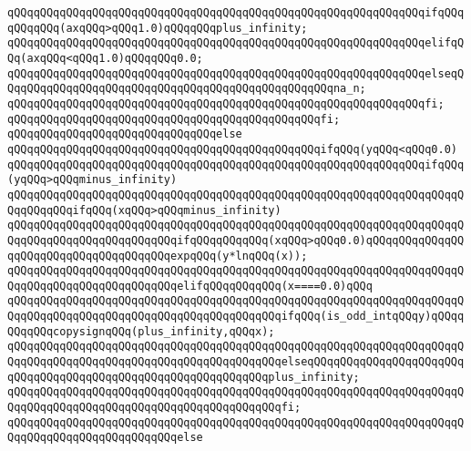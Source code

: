 \newline
\verb|qQQqqQQqqQQqqQQqqQQqqQQqqQQqqQQqqQQqqQQqqQQqqQQqqQQqqQQqqQQqqQQqifqQQqqQQqqQQq(axqQQq>qQQq1.0)qQQqqQQqplus_infinity;|\newline
\verb|qQQqqQQqqQQqqQQqqQQqqQQqqQQqqQQqqQQqqQQqqQQqqQQqqQQqqQQqqQQqqQQqelifqQQq(axqQQq<qQQq1.0)qQQqqQQq0.0;|\newline
\verb|qQQqqQQqqQQqqQQqqQQqqQQqqQQqqQQqqQQqqQQqqQQqqQQqqQQqqQQqqQQqqQQqelseqQQqqQQqqQQqqQQqqQQqqQQqqQQqqQQqqQQqqQQqqQQqqQQqqQQqna_n;|\newline
\verb|qQQqqQQqqQQqqQQqqQQqqQQqqQQqqQQqqQQqqQQqqQQqqQQqqQQqqQQqqQQqqQQqfi;|\newline
\verb|qQQqqQQqqQQqqQQqqQQqqQQqqQQqqQQqqQQqqQQqqQQqqQQqfi;|\newline
\verb|qQQqqQQqqQQqqQQqqQQqqQQqqQQqqQQqelse|\newline
\verb|qQQqqQQqqQQqqQQqqQQqqQQqqQQqqQQqqQQqqQQqqQQqqQQqifqQQq(yqQQq<qQQq0.0)|\newline
\newline
\verb|qQQqqQQqqQQqqQQqqQQqqQQqqQQqqQQqqQQqqQQqqQQqqQQqqQQqqQQqqQQqqQQqifqQQq(yqQQq>qQQqminus_infinity)|\newline
\newline
\verb|qQQqqQQqqQQqqQQqqQQqqQQqqQQqqQQqqQQqqQQqqQQqqQQqqQQqqQQqqQQqqQQqqQQqqQQqqQQqqQQqifqQQq(xqQQq>qQQqminus_infinity)|\newline
\verb|qQQqqQQqqQQqqQQqqQQqqQQqqQQqqQQqqQQqqQQqqQQqqQQqqQQqqQQqqQQqqQQqqQQqqQQqqQQqqQQqqQQqqQQqqQQqqQQqifqQQqqQQqqQQq(xqQQq>qQQq0.0)qQQqqQQqqQQqqQQqqQQqqQQqqQQqqQQqqQQqqQQqexpqQQq(y*lnqQQq(x));|\newline
\verb|qQQqqQQqqQQqqQQqqQQqqQQqqQQqqQQqqQQqqQQqqQQqqQQqqQQqqQQqqQQqqQQqqQQqqQQqqQQqqQQqqQQqqQQqqQQqqQQqelifqQQqqQQqqQQq(x====0.0)qQQq|\newline
\verb|qQQqqQQqqQQqqQQqqQQqqQQqqQQqqQQqqQQqqQQqqQQqqQQqqQQqqQQqqQQqqQQqqQQqqQQqqQQqqQQqqQQqqQQqqQQqqQQqqQQqqQQqqQQqqQQqifqQQq(is_odd_intqQQqy)qQQqqQQqqQQqcopysignqQQq(plus_infinity,qQQqx);|\newline
\verb|qQQqqQQqqQQqqQQqqQQqqQQqqQQqqQQqqQQqqQQqqQQqqQQqqQQqqQQqqQQqqQQqqQQqqQQqqQQqqQQqqQQqqQQqqQQqqQQqqQQqqQQqqQQqqQQqelseqQQqqQQqqQQqqQQqqQQqqQQqqQQqqQQqqQQqqQQqqQQqqQQqqQQqqQQqqQQqqQQqplus_infinity;|\newline
\verb|qQQqqQQqqQQqqQQqqQQqqQQqqQQqqQQqqQQqqQQqqQQqqQQqqQQqqQQqqQQqqQQqqQQqqQQqqQQqqQQqqQQqqQQqqQQqqQQqqQQqqQQqqQQqqQQqfi;|\newline
\verb|qQQqqQQqqQQqqQQqqQQqqQQqqQQqqQQqqQQqqQQqqQQqqQQqqQQqqQQqqQQqqQQqqQQqqQQqqQQqqQQqqQQqqQQqqQQqqQQqelse|\newline
